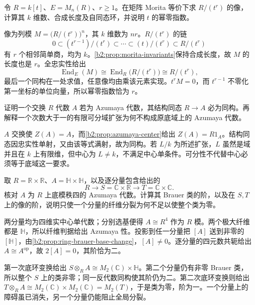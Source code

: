 \begin{exercise}\label{b2:ex:C-matrix-fat-point}
	令 \(R=k[t]\)、\(E=M_n(R)\)、\(r\ge1\)。在矩阵 Morita 等价下求 \(R/(t^r)\) 的像，计算其 \(k\) 维数、合成长度及自同态环，并说明 \(t\) 的幂零指数。
\end{exercise}
\begin{solution}
	像为列模 \(M=\bigl(R/(t^r)\bigr)^n\)，其 \(k\) 维数为 \(nr\)。\(R/(t^r)\) 的链
	\[
		0\subset(t^{r-1})/(t^r)\subset\cdots\subset(t)/(t^r)\subset R/(t^r)
	\]
	有 \(r\) 个相邻简单商，均为 \(k\)。\cref{b2:prop:morita-invariants}保持合成长度，故 \(M\) 的长度也是 \(r\)。全忠实性给出
	\[
		\operatorname{End}_E(M)\cong\operatorname{End}_R\bigl(R/(t^r)\bigr)\cong R/(t^r),
	\]
	最后一个同构在一处求值，任意像均由乘该元素实现。\(t^rM=0\)，而 \(t^{r-1}\) 不零化第一坐标的单位向量，所以幂零指数恰为 \(r\)。
\end{solution}

\begin{exercise}\label{b2:ex:C-commutative-azumaya}
	证明一个交换 \(R\) 代数 \(A\) 若为 Azumaya 代数，其结构同态 \(R\rightarrow A\) 必为同构。再解释一个次数大于一的有限可分域扩张为何不构成原底域上的 Azumaya 代数。
\end{exercise}
\begin{solution}
	\(A\) 交换使 \(Z(A)=A\)，而\cref{b2:prop:azumaya-center}给出 \(Z(A)=R1_A\)。结构同态因忠实性单射，又由该等式满射，故为同构。若 \(L/k\) 为所述扩张，\(L\) 虽然是域并且在 \(k\) 上有限维，但中心为 \(L\ne k\)，不满足中心单条件。可分性不代替中心必须等于底域这一要求。
\end{solution}

\begin{exercise}\label{b2:ex:C-fiber-brauer-obstruction}
	取 \(R=\mathbb R\times\mathbb R\)、\(A=\mathbb H\times\mathbb H\)，以及逐分量包含给出的
	\[
		R\longrightarrow S=\mathbb C\times\mathbb R \longrightarrow T=\mathbb C\times\mathbb C.
	\]
	核对 \(A\) 为 \(R\) 上底模秩四的 Azumaya 代数。计算其 Brauer 类的阶，以及在 \(S,T\) 上的像的阶，说明只使一个分量的纤维分裂为何不足以使整个类为零。
\end{exercise}
\begin{solution}
	两分量均为四维实中心单代数；分别选基便得 \(A\cong R^4\) 作为 \(R\) 模。两个极大纤维都是 \(\mathbb H\)，所以纤维判据给出 Azumaya 性。投影到任一分量把 \([A]\) 送到非零的 \([\mathbb H]\)，由\cref{b2:prop:ring-brauer-base-change}，\([A]\ne0\)。逐分量的四元数共轭给出 \(A\cong A^{\mathrm{op}}\)，故 \(2[A]=0\)，其阶恰为二。

	第一次底环变换给出 \(S\otimes_RA\cong M_2(\mathbb C)\times\mathbb H\)。第二个分量仍有非零 Brauer 类，所以整个 \(S\) 上的类非零；同一反代数同构使其阶仍为二。第二次底环变换则给出 \(T\otimes_RA\cong M_2(\mathbb C)\times M_2(\mathbb C)=M_2(T)\)，于是类为零，阶为一。一个分量上的障碍虽已消失，另一个分量仍能阻止全局分裂。
\end{solution}

